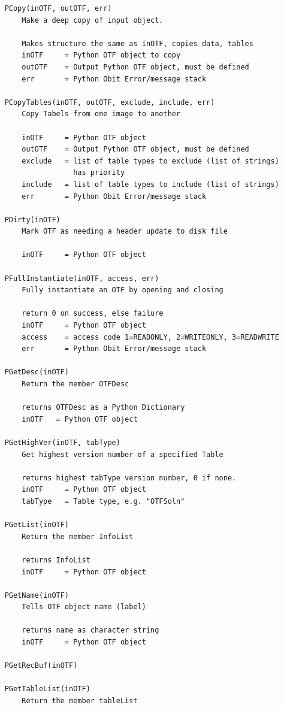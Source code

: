\documentclass[11pt]{report}
\begin{document}
\begin{verbatim}
    PCopy(inOTF, outOTF, err)
        Make a deep copy of input object.
        
        Makes structure the same as inOTF, copies data, tables
        inOTF     = Python OTF object to copy
        outOTF    = Output Python OTF object, must be defined
        err       = Python Obit Error/message stack
    
    PCopyTables(inOTF, outOTF, exclude, include, err)
        Copy Tabels from one image to another
        
        inOTF     = Python OTF object
        outOTF    = Output Python OTF object, must be defined
        exclude   = list of table types to exclude (list of strings)
                    has priority
        include   = list of table types to include (list of strings)
        err       = Python Obit Error/message stack
    
    PDirty(inOTF)
        Mark OTF as needing a header update to disk file
        
        inOTF     = Python OTF object
    
    PFullInstantiate(inOTF, access, err)
        Fully instantiate an OTF by opening and closing
        
        return 0 on success, else failure
        inOTF     = Python OTF object
        access    = access code 1=READONLY, 2=WRITEONLY, 3=READWRITE
        err       = Python Obit Error/message stack
    
    PGetDesc(inOTF)
        Return the member OTFDesc
        
        returns OTFDesc as a Python Dictionary
        inOTF   = Python OTF object
    
    PGetHighVer(inOTF, tabType)
        Get highest version number of a specified Table
        
        returns highest tabType version number, 0 if none.
        inOTF     = Python OTF object
        tabType   = Table type, e.g. "OTFSoln"
    
    PGetList(inOTF)
        Return the member InfoList
        
        returns InfoList
        inOTF     = Python OTF object
    
    PGetName(inOTF)
        Tells OTF object name (label)
        
        returns name as character string
        inOTF     = Python OTF object
    
    PGetRecBuf(inOTF)
    
    PGetTableList(inOTF)
        Return the member tableList
        

\end{verbatim}
\end{document}
